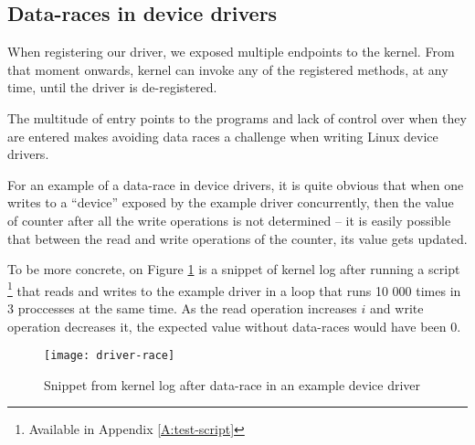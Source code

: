 \documentclass[..thesis.tex]{subfiles}
\begin{document}
\subsection{Data-races in device drivers}


When registering our driver, we exposed multiple endpoints to the kernel. From that moment onwards, kernel can invoke any of the registered methods, at any time, until the driver is de-registered. 


The multitude of entry points to the programs and lack of control over when they are entered makes avoiding data races a challenge when writing Linux device drivers. 

For an example of a data-race in device drivers, it is quite obvious that when one writes to a ``device'' exposed by the example driver concurrently, then the value of counter after all the write operations is not determined -- it is easily possible that between the read and write operations of the counter, its value gets updated.

To be more concrete, on Figure \ref{fig:driver-race} is a snippet of kernel log after running a script \footnote{Available in Appendix \ref{A:test-script}} that reads and writes to the example driver in a loop that
runs 10 000 times in 3 proccesses at the same time. As the read operation increases $i$ and write operation decreases it, the expected value without data-races would have been $0$.




\begin{figure}[H]
\centering
\texttt{[image: driver-race]}
\caption{Snippet from kernel log after data-race in an example device driver}
\label{fig:driver-race}
\end{figure}


\end{document}

